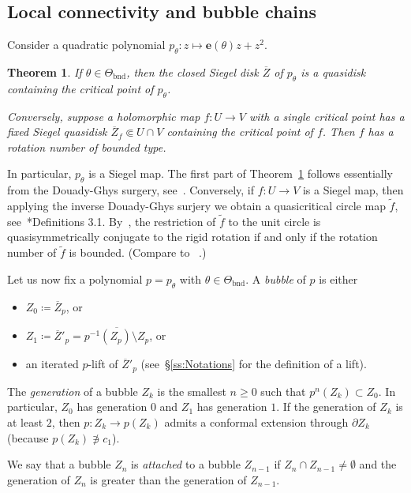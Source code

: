 \documentclass[]{amsart}
\newcommand{\ee}{\mathbf e}
\newtheorem{thm}{Theorem}[section]
\theoremstyle{remark}
\numberwithin{equation}{section}
\theoremstyle{definition}
\newcommand{\bnd}{{\mathrm{bnd}}}
\begin{document}
 

 
\subsection{Local connectivity and bubble chains}
\label{ss:LocConnK_p}
Consider a quadratic polynomial $p_\theta\colon z\mapsto \ee(\theta) z + z^2$. 

\begin{thm}
\label{thm:SiegJulSet P is LocCon}
If $\theta\in \Theta_\bnd$, then the closed Siegel disk $\overline Z$ of $p_\theta$ is a quasidisk containing the critical point of $p_\theta$.

Conversely, suppose a holomorphic map $f\colon U\to V$ with a single critical point has a fixed Siegel quasidisk $\overline Z_f\Subset U\cap V$ containing the critical point of $f$. Then $f$ has a rotation number of bounded type.
\end{thm}
\noindent In particular, $p_\theta$ is a Siegel map. The first part of Theorem~\ref{thm:SiegJulSet P is LocCon} follows essentially from the Douady-Ghys surgery, see~\cite{D-Siegel}. Conversely, if $f\colon U\to V$ is a Siegel map, then applying the inverse Douady-Ghys surjery we obtain a quasicritical circle map $\widetilde f$, see~\cite{AL-posmeas}*{Definitions 3.1}. By~\cites{H,Sw,AL-posmeas}, the restriction of $\widetilde f$ to the unit circle is quasisymmetrically conjugate to the rigid rotation if and only if the rotation number of $\widetilde f$ is bounded. (Compare to~ \cite{GJ}.)



Let us now fix a polynomial $p=p_\theta$ with $\theta\in \Theta_\bnd$. A \emph{bubble} of $p$ is either
\begin{itemize}
\item $Z_0\coloneqq \overline Z_p$, or
\item $Z_1\coloneqq  \overline Z'_p = \overline {p^{-1}(Z_p)\setminus Z_p}$, or
\item an iterated $p$-lift of $\overline Z'_p$ (see~\S\ref{ss:Notations} for the definition of a lift).
\end{itemize}
The \emph{generation} of a bubble $Z_k$ is the smallest $n\ge0$ such that $p^n(Z_k)\subset  Z_0$. In particular, $ Z_0$ has generation $0$ and $ Z_1$ has generation $1$. If the generation of $Z_k$ is at least $2$, then $p\colon Z_k\to p(Z_k)$ admits a conformal extension through $\partial Z_k$ (because  $p(Z_k)\not\ni c_1$).

We say that a bubble $Z_n$ is \emph{attached} to a bubble $Z_{n-1}$ if $Z_{n}\cap Z_{n-1}\not=\emptyset$ and the generation of $Z_{n}$ is greater than the generation of $Z_{n-1}$.
\end{document}

